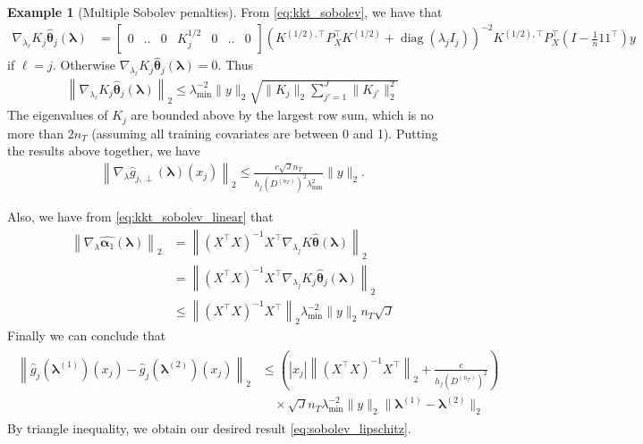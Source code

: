 \documentclass[10pt]{book}
\theoremstyle{definition}
\newtheorem{example}{Example}
\DeclareMathOperator{\diag}{diag}
\begin{document}
\begin{example}[Multiple Sobolev penalties]
	From \eqref{eq:kkt_sobolev}, we have that
	\begin{align}
	\nabla_{\lambda_\ell} K_j \hat{\boldsymbol{\theta}}_j(\boldsymbol{\lambda})
	& = 
	\left[
	\begin{matrix}
	0 & .. & 0 & K_j^{1/2} & 0 & .. & 0
	\end{matrix}
	\right]
	\left(
	K^{(1/2), \top} P_X^\top K^{(1/2)} + \diag(\lambda_j I_j)
	\right)^{-2}
	K^{(1/2), \top}
	P_X^\top (I - \frac{1}{n} 1 1^\top) y
	\end{align}
	if $\ell = j$.
	Otherwise $\nabla_{\lambda_\ell} K_j \hat{\boldsymbol{\theta}}_j(\boldsymbol{\lambda}) = 0$.
	Thus
	\begin{align}
	\left\|
	\nabla_{\lambda_\ell} K_j \hat{\boldsymbol{\theta}}_j(\boldsymbol{\lambda})
	\right \|_2
	\le
	\lambda_{\min}^{-2} \|y\|_2 \sqrt{\|K_j\|_2 \sum_{{j'}=1}^J \|K_{j'}\|_2^2}
	\end{align}
	The eigenvalues of $K_j$ are bounded above by the largest row sum, which is no more than $2 n_T$ (assuming all training covariates are between 0 and 1).
	Putting the results above together, we have
	\begin{align}
	\left \|
	\nabla_{\lambda} \hat{g}_{j, \perp}(\boldsymbol{\lambda})(x_j)
	\right \|_2
	\le
	\frac{c \sqrt{J} n_T}{h_j(D^{(n_T)})^2 \lambda_{\min}^2}
	\|y\|_2.
	\end{align}
	
	Also, we have from \eqref{eq:kkt_sobolev_linear} that
	\begin{align}
	\left \| \nabla_{\lambda} \hat{\boldsymbol{\alpha}_1}(\boldsymbol{\lambda}) \right \|_2
	& =
	\left \|
	\left(
	X^\top X
	\right)^{-1}
	X^\top
	\nabla_{\lambda_j} K \hat{\boldsymbol{\theta}}(\boldsymbol{\lambda})
	\right \|_2 \\
	& =
	\left \|
	\left(
	X^\top X
	\right)^{-1}
	X^\top
	\nabla_{\lambda_j} K_j \hat{\boldsymbol{\theta}}_j(\boldsymbol{\lambda})
	\right \|_2 \\
	& \le
	\left \|
	\left(
	X^\top X
	\right)^{-1}
	X^\top
	\right \|_2
	\lambda_{\min}^{-2} \|y\|_2 n_T \sqrt{J}
	\end{align}
	Finally we can conclude that
	\begin{align}
	\begin{split}
	\left \|
	\hat{g}_j(\boldsymbol{\lambda}^{(1)})(x_j)
	- \hat{g}_j(\boldsymbol{\lambda}^{(2)})(x_j)
	\right \|_2
	& \le
	\left(
	|x_j|
	\left \|
	\left(
	X^\top X
	\right)^{-1}
	X^\top
	\right \|_2
	+
	\frac{c }{h_j(D^{(n_T)})^2}
	\right)\\
	& \quad \times
	\sqrt{J}
	n_T
	\lambda_{\min}^{-2}
	\|y\|_2
	\| \boldsymbol{\lambda}^{(1)} - \boldsymbol{\lambda}^{(2)}\|_2
	\end{split}
	\end{align}
	By triangle inequality, we obtain our desired result \eqref{eq:sobolev_lipschitz}.
\end{example}
\end{document}
